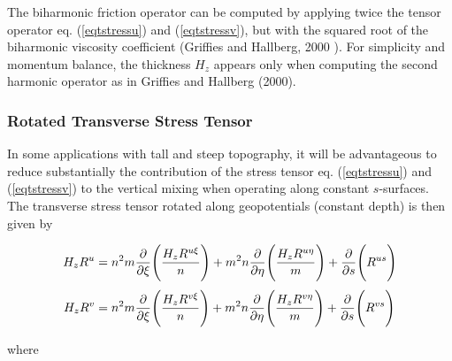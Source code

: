 The biharmonic friction operator can be computed by applying twice
the tensor operator eq. (\ref{eqtstressu}) and (\ref{eqtstressv}), but
with the squared root of the biharmonic viscosity coefficient (Griffies
and Hallberg, 2000 \cite{Griffies_2000}).  For simplicity and momentum
balance, the thickness $H_{z}$ appears only when computing the second
harmonic operator as in Griffies and Hallberg (2000).

\subsubsection{Rotated Transverse Stress Tensor}

In some applications with tall and steep topography, it
will be advantageous to reduce substantially the contribution of the
stress tensor eq. (\ref{eqtstressu}) and (\ref{eqtstressv}) to
the vertical mixing when operating along constant $s$-surfaces.
The transverse stress tensor rotated along geopotentials (constant depth)
is then given by

\begin{align}
      H_{z}R^{u} &= {n^2}m {\pder{}{\xi}}  \Biggl(
\frac{H_{z}R^{u\xi}} {n} \Biggr) +
                    {m^2}n {\pder{}{\eta}} \Biggl(
\frac{H_{z}R^{u\eta}}{m} \Biggr) +
                           {\pder{}{s}}    \Biggl( R^{us} \Biggr)
\label{eqrstressu}
\\
   \noalign{\smallskip}
      H_{z}R^{v} &= {n^2}m {\pder{}{\xi}}  \Biggl(
\frac{H_{z}R^{v\xi}} {n} \Biggr) +
                    {m^2}n {\pder{}{\eta}} \Biggl(
\frac{H_{z}R^{v\eta}}{m} \Biggr) +
                           {\pder{}{s}}    \Biggl( R^{vs} \Biggr)
\label{eqrstressv}
\end{align}

where

